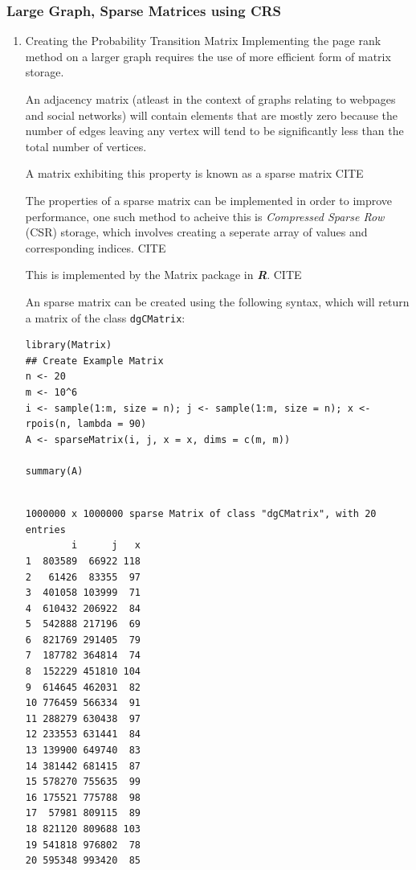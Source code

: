 \documentclass[11pt]{article}
\begin{document}
\subsubsection{Large Graph, Sparse Matrices using CRS}
\label{sec:orgdea8fd8}
\begin{enumerate}
\item Creating the Probability Transition Matrix
\label{sec:orgef3aeb4}
Implementing the page rank method on a larger graph requires the use of more efficient form of matrix storage.

An adjacency matrix (atleast in the context of graphs relating to webpages and social networks) will contain elements that are mostly zero because the number of edges leaving any vertex will tend to be significantly less than the total number of vertices.

A matrix exhibiting this property is known as a sparse matrix CITE

The properties of a sparse matrix can be implemented in order to improve performance, one such method to acheive this is \emph{Compressed Sparse Row} (CSR) storage, which involves creating a seperate array of values and corresponding indices. CITE

This is implemented by the Matrix package in \textbf{\emph{R}}. CITE

An sparse matrix can be created using the following syntax, which will return a matrix of the class \texttt{dgCMatrix}:

\lstset{language=r,label= ,caption= ,captionpos=b,numbers=none}
\begin{lstlisting}
library(Matrix)
## Create Example Matrix
n <- 20
m <- 10^6
i <- sample(1:m, size = n); j <- sample(1:m, size = n); x <- rpois(n, lambda = 90)
A <- sparseMatrix(i, j, x = x, dims = c(m, m))

summary(A)
\end{lstlisting}

\begin{verbatim}

1000000 x 1000000 sparse Matrix of class "dgCMatrix", with 20 entries
        i      j   x
1  803589  66922 118
2   61426  83355  97
3  401058 103999  71
4  610432 206922  84
5  542888 217196  69
6  821769 291405  79
7  187782 364814  74
8  152229 451810 104
9  614645 462031  82
10 776459 566334  91
11 288279 630438  97
12 233553 631441  84
13 139900 649740  83
14 381442 681415  87
15 578270 755635  99
16 175521 775788  98
17  57981 809115  89
18 821120 809688 103
19 541818 976802  78
20 595348 993420  85
\end{verbatim}


\end{enumerate}
\end{document}
